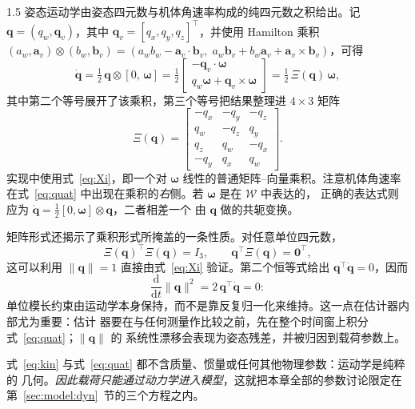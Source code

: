 \begin{spacing}{1.5}
姿态运动学由姿态四元数与机体角速率构成的纯四元数之积给出。记
$\bm{q} = (q_w, \bm{q}_v)$，其中 $\bm{q}_v = [q_x, q_y, q_z]^{\!\top}$，并使用 Hamilton 乘积
$(a_w, \bm{a}_v) \otimes (b_w, \bm{b}_v) =
(a_w b_w - \bm{a}_v \!\cdot\! \bm{b}_v,\;
a_w \bm{b}_v + b_w \bm{a}_v + \bm{a}_v \!\times\! \bm{b}_v)$，可得
\begin{equation}
\dot{\bm{q}} = \tfrac{1}{2}\, \bm{q} \otimes [0,\, \bm{\omega}]
= \tfrac{1}{2}
\begin{bmatrix}
-\bm{q}_v \cdot \bm{\omega} \\[2pt]
q_w \bm{\omega} + \bm{q}_v \times \bm{\omega}
\end{bmatrix}
= \tfrac{1}{2}\, \Xi(\bm{q})\, \bm{\omega},
\label{eq:quat}
\end{equation}
其中第二个等号展开了该乘积，第三个等号把结果整理进 $4 \times 3$ 矩阵
\begin{equation}
\Xi(\bm{q}) =
\begin{bmatrix}
-q_x & -q_y & -q_z \\
 q_w & -q_z &  q_y \\
 q_z &  q_w & -q_x \\
-q_y &  q_x &  q_w
\end{bmatrix}.
\label{eq:Xi}
\end{equation}
实现中使用式~\eqref{eq:Xi}，即一个对 $\bm{\omega}$ 线性的普通矩阵--向量乘积。注意机体角速率
在式~\eqref{eq:quat} 中出现在乘积的\emph{右}侧。若 $\bm{\omega}$ 是在 $\mathcal{W}$ 中表达的，
正确的表达式则应为 $\dot{\bm{q}} = \tfrac{1}{2} [0, \bm{\omega}] \otimes \bm{q}$，二者相差一个
由 $\bm{q}$ 做的共轭变换。

矩阵形式还揭示了乘积形式所掩盖的一条性质。对任意单位四元数，
\begin{equation}
\Xi(\bm{q})^{\!\top}\Xi(\bm{q}) = I_3,
\qquad
\bm{q}^{\!\top}\Xi(\bm{q}) = \bm{0}^{\!\top},
\label{eq:Xiprops}
\end{equation}
这可以利用 $\lVert\bm{q}\rVert=1$ 直接由式~\eqref{eq:Xi} 验证。第二个恒等式给出
$\bm{q}^{\!\top}\dot{\bm{q}} = 0$，因而
\begin{equation}
\frac{\mathrm{d}}{\mathrm{d}t}\lVert\bm{q}\rVert^2
= 2\,\bm{q}^{\!\top}\dot{\bm{q}} = 0 :
\label{eq:normconserve}
\end{equation}
单位模长约束由运动学本身保持，而不是靠反复归一化来维持。这一点在估计器内部尤为重要：估计
器要在与任何测量作比较之前，先在整个时间窗上积分式~\eqref{eq:quat}；$\lVert\bm{q}\rVert$ 的
系统性漂移会表现为姿态残差，并被归因到载荷参数上。

式~\eqref{eq:kin} 与式~\eqref{eq:quat} 都不含质量、惯量或任何其他物理参数：运动学是纯粹的
几何。\emph{因此载荷只能通过动力学进入模型}，这就把本章全部的参数讨论限定在
第~\ref{sec:model:dyn}~节的三个方程之内。


\end{spacing}
